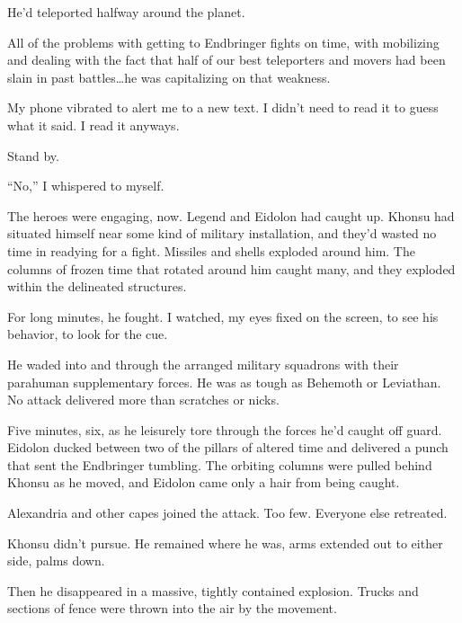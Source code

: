 He'd teleported halfway around the planet.



All of the problems with getting to Endbringer fights on time, with mobilizing and dealing with the fact that half of our best teleporters and movers had been slain in past battles\ldots he was capitalizing on that weakness.



My phone vibrated to alert me to a new text.  I didn't need to read it to guess what it said.  I read it anyways.



Stand by.



``No,'' I whispered to myself.



The heroes were engaging, now.  Legend and Eidolon had caught up.  Khonsu had situated himself near some kind of military installation, and they'd wasted no time in readying for a fight.  Missiles and shells exploded around him.  The columns of frozen time that rotated around him caught many, and they exploded within the delineated structures.



For long minutes, he fought.  I watched, my eyes fixed on the screen, to see his behavior, to look for the cue.



He waded into and through the arranged military squadrons with their parahuman supplementary forces.  He was as tough as Behemoth or Leviathan.  No attack delivered more than scratches or nicks.



Five minutes, six, as he leisurely tore through the forces he'd caught off guard.  Eidolon ducked between two of the pillars of altered time and delivered a punch that sent the Endbringer tumbling.  The orbiting columns were pulled behind Khonsu as he moved, and Eidolon came only a hair from being caught.



Alexandria and other capes joined the attack.  Too few.  Everyone else retreated.



Khonsu didn't pursue.  He remained where he was, arms extended out to either side, palms down.



Then he disappeared in a massive, tightly contained explosion.  Trucks and sections of fence were thrown into the air by the movement.



